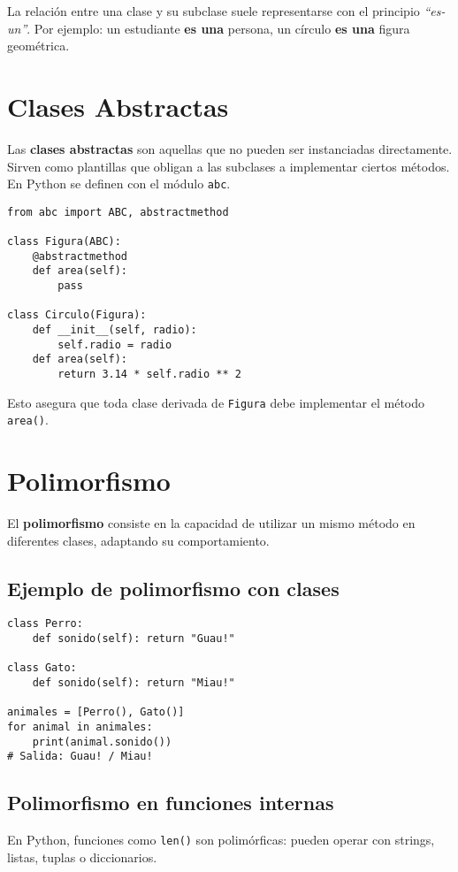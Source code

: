 \documentclass[a4paper,12pt]{article}
\begin{document}
La relación entre una clase y su subclase suele representarse con el principio \textit{“es-un”}.  
Por ejemplo: un estudiante \textbf{es una} persona, un círculo \textbf{es una} figura geométrica.

\section{Clases Abstractas}
Las \textbf{clases abstractas} son aquellas que no pueden ser instanciadas directamente.  
Sirven como plantillas que obligan a las subclases a implementar ciertos métodos. En Python se definen con el módulo \texttt{abc}.

\begin{lstlisting}
from abc import ABC, abstractmethod

class Figura(ABC):
    @abstractmethod
    def area(self):
        pass

class Circulo(Figura):
    def __init__(self, radio):
        self.radio = radio
    def area(self):
        return 3.14 * self.radio ** 2
\end{lstlisting}

Esto asegura que toda clase derivada de \texttt{Figura} debe implementar el método \texttt{area()}.

\section{Polimorfismo}
El \textbf{polimorfismo} consiste en la capacidad de utilizar un mismo método en diferentes clases, adaptando su comportamiento.

\subsection*{Ejemplo de polimorfismo con clases}
\begin{lstlisting}
class Perro:
    def sonido(self): return "Guau!"

class Gato:
    def sonido(self): return "Miau!"

animales = [Perro(), Gato()]
for animal in animales:
    print(animal.sonido())
# Salida: Guau! / Miau!
\end{lstlisting}

\subsection*{Polimorfismo en funciones internas}
En Python, funciones como \texttt{len()} son polimórficas: pueden operar con strings, listas, tuplas o diccionarios.
\end{document}
